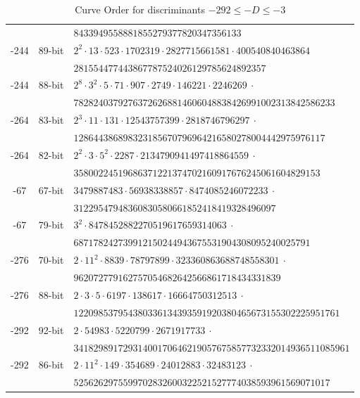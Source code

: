 \documentclass{amsart}
\begin{document}
\begin{table*}[ht]
\begin{tabularx}{\textwidth}{ccl}
         			&   & \tt   $ 8433949558881855279377820347356133$\\  
       	 -244 &  89-bit & \tt $  2^2 \cdot  13 \cdot  523 \cdot  1702319 \cdot  2827715661581 \cdot  400540840463864$  \\
         			&   & \tt     $281554477443867787524026129785624892357$\\  
       	 -244 &  88-bit & \tt $  2^8 \cdot 3^2 \cdot 5 \cdot 71 \cdot 907 \cdot 2749 \cdot 146221 \cdot 2246269 ~\cdot $  \\
         			&   & \tt     $78282403792763726268814606048838426991002313842586233$\\  			
       	 -264 &  83-bit & \tt $  2^3 \cdot  11 \cdot  131 \cdot  12543757399 \cdot  2818746796297 ~\cdot  $  \\
         			&   & \tt    $ 128644386898323185670796964216580278004442975976117$\\  	
       	 -264 &  82-bit & \tt $  2^2 \cdot 3 \cdot 5^2 \cdot 2287 \cdot 2134790941497418864559 ~\cdot  $  \\
         			&   & \tt   $35800224519686371221374702160917676245061604829153$\\  
       	 -67 &  67-bit & \tt $  3479887483 \cdot 56938338857 \cdot 8474085246072233 ~\cdot  $  \\
         			&   & \tt   $31229547948360830580661852418419328496097$\\  			
       	 -67 &  79-bit & \tt $  3^2 \cdot 8478452882270519617659314063 ~\cdot  $  \\
         			&   & \tt   $687178242739912150244943675531904308095240025791$\\  	
       	 -276 &  70-bit & \tt $  2 \cdot 11^2 \cdot 8839 \cdot 78797899 \cdot 323360863688748558301 ~\cdot  $  \\
         			&   & \tt   $962072779162757054682642566861718434331839$\\  	
       	 -276 &  88-bit & \tt $  2 \cdot 3 \cdot 5 \cdot 6197 \cdot 138617 \cdot 16664750312513 ~\cdot  $  \\
         			&   & \tt  $122098537954380336134393591920380465673155302225951761$\\  	
       	 -292 &  92-bit & \tt $  2 \cdot  54983 \cdot  5220799 \cdot  2671917733 ~\cdot  $  \\
         			&   & \tt   $34182989172931400170646219057675857732332014936511085961$\\  	
       	 -292 &  86-bit & \tt $  2 \cdot 11^2 \cdot 149 \cdot 354689 \cdot 24012883 \cdot 32483123 ~\cdot  $  \\
         			&   & \tt  $5256262975599702832600322521527774038593961569071017$\\  	
        \bottomrule
    \end{tabularx}
    \caption{Curve Order for discriminants $-292 \leq -D \leq -3$ }
    \label{tab:group-order-factorization}
\end{table*}
\end{document}
